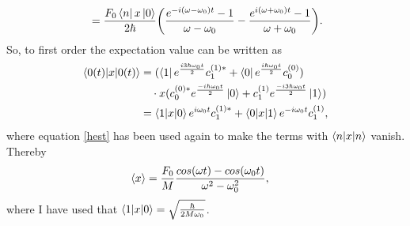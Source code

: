 \begin{example}
\begin{equation}
\begin{split}
			&=\frac{F_0\bra{n}x\ket{0}}{2\hbar}\bigg(\frac{e^{-i(\omega-\omega_0)t}-1}{\omega-\omega_0}-\frac{e^{i(\omega+\omega_0)t}-1}{\omega+\omega_0}\bigg).\\
		\end{split}
	\end{equation} 
	So, to first order the expectation value can be written as
	\begin{equation}
		\begin{split}
			\braket{0(t)|x|0(t)}&=(\bra{1}e^{\frac{i3\hbar\omega_0t}{2}}c_1^{(1)*}+\bra{0}e^{\frac{i\hbar\omega_0t}{2}}c_0^{(0)})\\
			&\quad\cdot x(c_0^{(0)*}e^{\frac{-i\hbar\omega_0t}{2}}\ket{0}+c_1^{(1)}e^{\frac{-i3\hbar\omega_0t}{2}}\ket{1})\\
			&=\braket{1|x|0}e^{i\omega_0t}c_1^{(1)*}+\braket{0|x|1}e^{-i\omega_0t}c_1^{(1)},
		\end{split}
	\end{equation} 
	where equation \eqref{hest} has been used again to make the terms with $\braket{n|x|n}$ vanish. Thereby
	\begin{equation}
		\begin{split}
			\braket{x}&=\frac{F_0}{M}\frac{cos(\omega t)-cos(\omega_0t)}{\omega^2-\omega_0^2},
		\end{split}
	\end{equation} 
	where I have used that $\braket{1|x|0}=\sqrt{\frac{\hbar}{2M\omega_0}}$.
\end{example}


